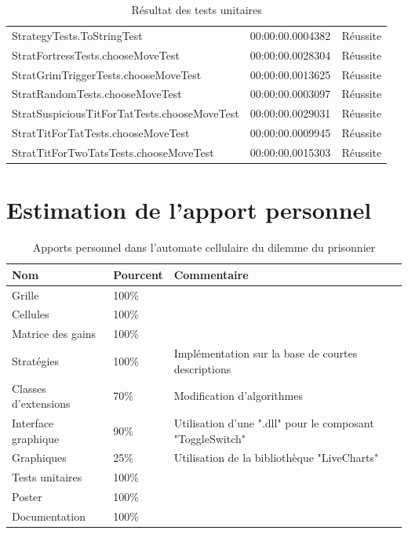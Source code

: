 \documentclass[a4paper, french]{article}
\begin{document}
\begin{table}[htp]
\begin{tabular}{lll}
StrategyTests.ToStringTest                   & 00:00:00.0004382 & Réussite \\
StratFortressTests.chooseMoveTest            & 00:00:00.0028304 & Réussite \\
StratGrimTriggerTests.chooseMoveTest         & 00:00:00.0013625 & Réussite \\
StratRandomTests.chooseMoveTest              & 00:00:00.0003097 & Réussite \\
StratSuspiciousTitForTatTests.chooseMoveTest & 00:00:00.0029031 & Réussite \\
StratTitForTatTests.chooseMoveTest           & 00:00:00.0009945 & Réussite \\
StratTitForTwoTatsTests.chooseMoveTest       & 00:00:00.0015303 & Réussite \\
\hline
\end{tabular}
\caption{Résultat des tests unitaires}
\end{table}
\vfill{}

\pagebreak
\section{Estimation de l'apport personnel}
\begin{table}[htp]
\centering
\begin{tabular}{lll}
\hline
\textbf{Nom}        & \textbf{Pourcent} & \textbf{Commentaire}                                      \\ \hline
Grille              & 100\%             &                                                           \\
Cellules            & 100\%             &                                                           \\
Matrice des gains   & 100\%             &                                                           \\
Stratégies          & 100\%             & Implémentation sur la base de courtes descriptions \cite{StratIPD}\cite{StratIPD2}\\
Classes d'extensions& 70\%              & Modification d'algorithmes                                \\
Interface graphique & 90\%              & Utilisation d'une ".dll" pour le composant "ToggleSwitch" \\
Graphiques          & 25\%              & Utilisation de la bibliothèque "LiveCharts"               \\
Tests unitaires     & 100\%             &                                                           \\
Poster              & 100\%             &                                                           \\
Documentation       & 100\%             &                                                           \\ \hline
\end{tabular}
\caption{Apports personnel dans l'automate cellulaire du dilemme du prisonnier}
\end{table}
\end{document}
